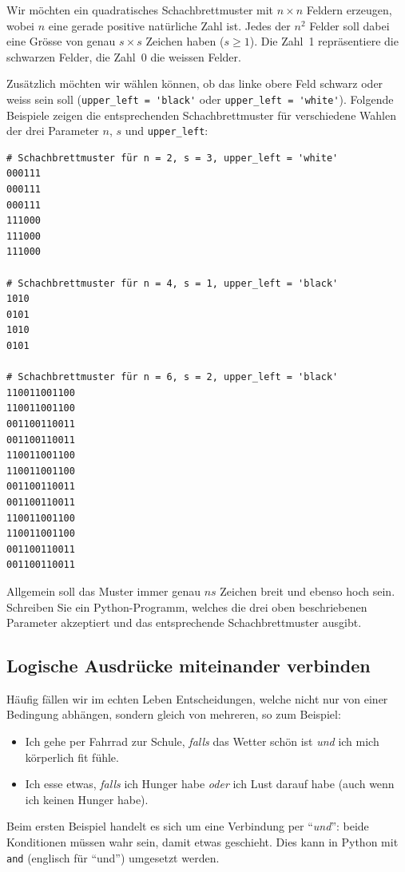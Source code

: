 \begin{mychallenge}


	Wir möchten ein quadratisches Schachbrettmuster mit $n \times n$ Feldern erzeugen, wobei $n$ eine gerade positive natürliche Zahl ist. Jedes der $n^2$ Felder soll dabei eine Grösse von genau $s \times s$ Zeichen haben ($s \geq 1$). Die Zahl~1 repräsentiere die schwarzen Felder, die Zahl~0 die weissen Felder.

	Zusätzlich möchten wir wählen können, ob das linke obere Feld schwarz oder weiss sein soll (\lstinline|upper_left = 'black'| oder \lstinline|upper_left = 'white'|). Folgende Beispiele zeigen die entsprechenden Schachbrettmuster für verschiedene Wahlen der drei Parameter $n$, $s$ und \lstinline|upper_left|:

	\begin{verbatim}
# Schachbrettmuster für n = 2, s = 3, upper_left = 'white'
000111
000111
000111
111000
111000
111000

# Schachbrettmuster für n = 4, s = 1, upper_left = 'black'
1010
0101
1010
0101

# Schachbrettmuster für n = 6, s = 2, upper_left = 'black'
110011001100
110011001100
001100110011
001100110011
110011001100
110011001100
001100110011
001100110011
110011001100
110011001100
001100110011
001100110011
\end{verbatim}

	Allgemein soll das Muster immer genau $ns$ Zeichen breit und ebenso hoch sein. Schreiben Sie ein Python-Programm, welches die drei oben beschriebenen Parameter akzeptiert und das entsprechende Schachbrettmuster ausgibt.
	\begin{myanswer}
		
	\end{myanswer}
\end{mychallenge}

\subsection{Logische Ausdrücke miteinander verbinden}



Häufig fällen wir im echten Leben Entscheidungen, welche nicht nur von einer Bedingung abhängen, sondern gleich von mehreren, so zum Beispiel:
\begin{itemize}
	\item Ich gehe per Fahrrad zur Schule, \textit{falls} das Wetter schön ist \textit{und} ich mich körperlich fit fühle.
	\item Ich esse etwas, \textit{falls} ich Hunger habe \textit{oder} ich Lust darauf habe (auch wenn ich keinen Hunger habe).
\end{itemize}
Beim ersten Beispiel handelt es sich um eine Verbindung per ``\textit{und}'': beide Konditionen müssen wahr sein, damit etwas geschieht. Dies kann in Python mit \lstinline|and| (englisch für ``und'') umgesetzt werden.

